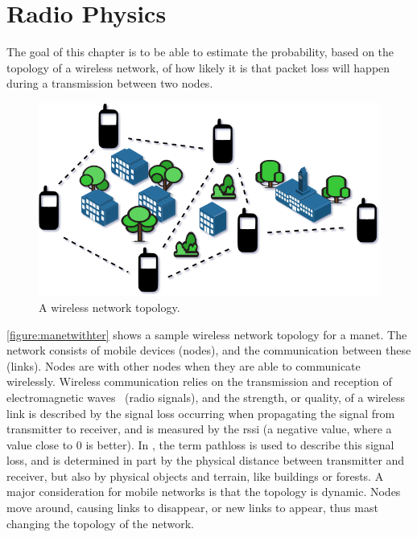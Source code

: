\chapter{Radio Physics}\label{ch:radio-physics}
The goal of this chapter is to be able to estimate the probability, based on the topology of a wireless
network, of how likely it is that packet loss will happen during a transmission between two nodes.


\begin{figure}[ht]
    \centering
    \includegraphics[width=.7\textwidth]{figures/manet_with_terrain.png}
    \caption{A wireless network topology.}
    \label{figure:manetwithter}
\end{figure}

\autoref{figure:manetwithter} shows a sample wireless network topology for a \acrfull{manet}. The network
consists of mobile devices (nodes), and the communication between these (links). Nodes are
 with other nodes when they are able to communicate wirelessly. Wireless communication
relies on the transmission and reception of electromagnetic waves~\cite[p.~10]{paper:linkmodel} (radio
signals), and the strength, or quality, of a wireless link is described by the signal loss occurring when
propagating the signal from transmitter to receiver, and is measured by the \gls{rssi} (a negative value,
where a value close to 0 is better). In \cite{paper:linkmodel}, the term \gls{pathloss} is used to describe
this signal loss, and is determined in part by the physical distance between transmitter and receiver, but
also by physical objects and terrain, like buildings or forests. A major consideration for mobile networks is
that the topology is dynamic. Nodes move around, causing links to disappear, or new links to appear, thus mast
changing the topology of the network.





